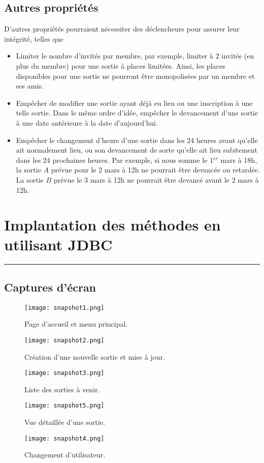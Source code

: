 \documentclass[11pt,letterpaper]{article}
\begin{document}
\subsection{Autres propriétés}
D'autres propriétés pourraient nécessiter des déclencheurs pour assurer leur intégrité, telles que\\
\begin{itemize}
  \item Limiter le nombre d'invités par membre, par exemple, limiter à 2 invités (en plus du membre) pour une sortie à places limitées. Ainsi, les places disponibles pour une sortie ne pourront être monopolisées par un membre et ses amis.
  \item Empêcher de modifier une sortie ayant déjà eu lieu ou une inscription à une telle sortie. Dans le même ordre d'idée, empêcher le devancement d'une sortie à une date antérieure à la date d'aujourd'hui.
  \item Empêcher le changement d'heure d'une sortie dans les 24 heures avant qu'elle ait normalement lieu, ou son devancement de sorte qu'elle ait lieu subitement dans les 24 prochaines heures. Par exemple, si nous somme le 1$^{er}$ mars à 18h, la sortie $A$ prévue pour le 2 mars à 12h ne pourrait être devancée ou retardée. La sortie $B$ prévue le 3 mars à 12h ne pourrait être devancé avant le 2 mars à 12h.
\end{itemize}



\section{Implantation des méthodes en utilisant JDBC}
\hrule
\vspace{1em}
\subsection{Captures d'écran}
\begin{figure}[H]
  \centering
  \texttt{[image: snapshot1.png]}
  \caption{Page d'accueil et menu principal.}
\end{figure}

\begin{figure}[H]
  \centering
  \texttt{[image: snapshot2.png]}
  \caption{Création d'une nouvelle sortie et mise à jour.}
\end{figure}

\begin{figure}[H]
  \centering
  \texttt{[image: snapshot3.png]}
  \caption{Liste des sorties à venir.}
\end{figure}

\begin{figure}[H]
  \centering
  \texttt{[image: snapshot5.png]}
  \caption{Vue détaillée d'une sortie.}
\end{figure}

\begin{figure}[H]
  \centering
  \texttt{[image: snapshot4.png]}
  \caption{Changement d'utilisateur.}
\end{figure}
\end{document}
